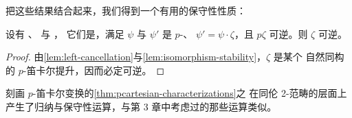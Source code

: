 把这些结果结合起来，我们得到一个有用的保守性性质：

\begin{lemma}[笛卡尔保守性]\label{lem:cartesian-conservativity}
设有
、
与
，
它们是\trNaturalTransformation，满足 $\psi$ 与 $\psi'$ 是 $p$-\trCartesian、%
$\psi'=\psi\cdot\zeta$，且 $p\zeta$ 可逆。则 $\zeta$ 可逆。
\end{lemma}

\begin{proof}
由\cref{lem:left-cancellation}与\cref{lem:isomorphism-stability}，$\zeta$ 是某个%
自然同构的 $p$-笛卡尔提升，因而必定可逆。
\end{proof}

刻画 $p$-笛卡尔变换的\cref{thm:pcartesian-characterizations}之\trUniversalProperty{}%
在同伦 2-范畴的层面上产生了归纳与保守性运算，与第 3 章中考虑过的那些运算类似。

